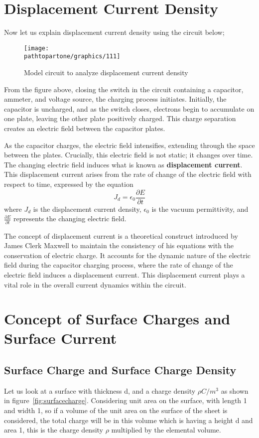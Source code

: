 \section{Displacement Current Density}
Now let us explain displacement current density using the circuit below;

\begin{figure}[h]
	\centering
	\texttt{[image: \\pathtopartone/graphics/111]}
	\caption{Model circuit to analyze displacement current density}
	\label{fig:displacement current density}
\end{figure} 
From the figure above, closing the switch in the circuit containing a capacitor, ammeter, and voltage source, the charging process initiates. Initially, the capacitor is uncharged, and as the switch closes, electrons begin to accumulate on one plate, leaving the other plate positively charged. This charge separation creates an electric field between the capacitor plates.

As the capacitor charges, the electric field intensifies, extending through the space between the plates. Crucially, this electric field is not static; it changes over time. The changing electric field induces what is known as \textbf{displacement current}. This displacement current arises from the rate of change of the electric field with respect to time, expressed by the equation
\[
J_d = \epsilon_0 \frac{\partial E}{\partial t}
\]
\begin{equation}\end{equation}
where \(J_d\) is the displacement current density, \(\epsilon_0\) is the vacuum permittivity, and \(\frac{\partial E}{\partial t}\) represents the changing electric field.

The concept of displacement current is a theoretical construct introduced by James Clerk Maxwell to maintain the consistency of his equations with the conservation of electric charge. It accounts for the dynamic nature of the electric field during the capacitor charging process, where the rate of change of the electric field induces a displacement current. This displacement current plays a vital role in the overall current dynamics within the circuit.

\section{Concept of Surface Charges and Surface Current}

\subsection{Surface Charge and Surface Charge Density}
Let us look at a surface with thickness d, and a charge density $\rho$$C/m^{3}$ as shown in figure~\ref{fig:surfacecharge}. Considering unit area on the surface, with length 1 and width 1, so if a volume of the unit area on the surface of the sheet is considered, the total charge will be in this volume which is having a height d and area 1, this is the charge density $\rho$ multiplied by the elemental volume.


